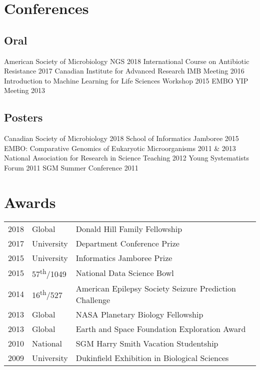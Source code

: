 \documentclass[]{Finlay_Maguire_CV}
\begin{document}
\begin{minipage}[t]{0.66\textwidth}
\section{Conferences}

\subsection{Oral}
    American Society of Microbiology NGS 2018 \textbullet{} International Course on Antibiotic Resistance 2017 \textbullet{}
    Canadian Institute for Advanced Research IMB Meeting 2016 \textbullet{}
    Introduction to Machine Learning for Life Sciences Workshop 2015 \textbullet{}
EMBO YIP Meeting 2013\\
\vspace{0.1cm}
\subsection{Posters}
Canadian Society of Microbiology 2018 \textbullet{} School of Informatics Jamboree 2015 \textbullet{} 
    EMBO: Comparative Genomics of Eukaryotic Microorganisms 2011 \& 2013 \textbullet{}
    National Association for Research in Science Teaching 2012 \textbullet{}
    Young Systematists Forum 2011 \textbullet{} SGM Summer Conference 2011 \\

\sectionsep

\vspace{-0.4cm}

\section{Awards} 
\begin{tabular}{rll}
2018         & Global      & Donald Hill Family Fellowship \\
2017         & University  & Department Conference Prize \\
2015	     & University  & Informatics Jamboree Prize \\
2015         & 57\textsuperscript{th}/1049 & National Data Science Bowl\\
2014         & 16\textsuperscript{th}/527 & American Epilepsy Society Seizure Prediction Challenge \\
2013	     & Global & NASA Planetary Biology Fellowship \\
2013	     & Global & Earth and Space Foundation Exploration Award\\
2010     & National & SGM Harry Smith Vacation Studentship\\
2009     & University & Dukinfield Exhibition in Biological Sciences\\
\end{tabular}


\end{minipage}
\end{document}
